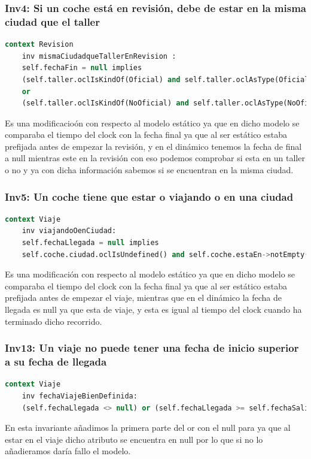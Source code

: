 \documentclass[12pt.a4paper]{article}
\begin{document}
\subsubsection{Inv4: Si un coche está en revisión, debe de estar en la misma ciudad que el taller}
    \begin{lstlisting}[style = useEspecifico,language=SQL]
context Revision
    inv mismaCiudadqueTallerEnRevision :
    self.fechaFin = null implies 
    (self.taller.oclIsKindOf(Oficial) and self.taller.oclAsType(Oficial).ciudad = self.coche.ciudad)
    or
    (self.taller.oclIsKindOf(NoOficial) and self.taller.oclAsType(NoOficial).ciudad = self.coche.ciudad)
    \end{lstlisting}
    Es una modificacioón con respecto al modelo estático ya que en dicho modelo se comparaba el tiempo del clock con la fecha final ya que al ser estático estaba prefijada antes de empezar la revisión, y en el dinámico tenemos la fecha de final a null mientras este en la revisión con eso podemos comprobar si esta en un taller o no y ya con dicha información sabemos si se encuentran en la misma ciudad.

\subsubsection{Inv5: Un coche tiene que estar o viajando o en una ciudad}
    \begin{lstlisting}[style = useEspecifico,language=SQL]
context Viaje
    inv viajandoOenCiudad:
    self.fechaLlegada = null implies
    self.coche.ciudad.oclIsUndefined() and self.coche.estaEn->notEmpty()
    \end{lstlisting}
    Es una modificación con respecto al modelo estático ya que en dicho modelo se comparaba el tiempo del clock con la fecha final ya que al ser estático estaba prefijada antes de empezar el viaje, mientras que en el dinámico la fecha de llegada es null ya que esta de viaje, y esta es igual al tiempo del clock cuando ha terminado dicho recorrido.


\subsubsection{Inv13: Un viaje no puede tener una fecha de inicio superior a su fecha de llegada}
    \begin{lstlisting}[style = useEspecifico,language=SQL]
context Viaje
    inv fechaViajeBienDefinida:
    (self.fechaLlegada <> null) or (self.fechaLlegada >= self.fechaSalida)
    \end{lstlisting}
    En esta invariante añadimos la primera parte del or con el null para ya que al estar en el viaje dicho atributo se encuentra en null por lo que si no lo añadieramos daría fallo el modelo.
\end{document}
